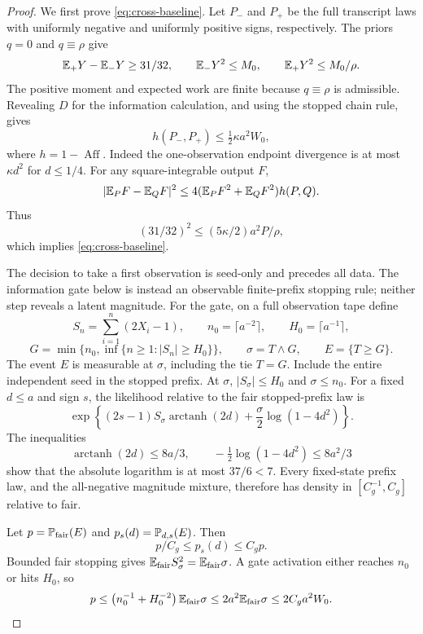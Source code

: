 \begin{proof}
We first prove \eqref{eq:cross-baseline}.  Let \(P_-\) and \(P_+\) be
the full transcript laws with uniformly negative and uniformly positive
signs, respectively.  The priors \(q=0\) and \(q\equiv\rho\) give
\[
 \mathbb E_+Y-\mathbb E_-Y\ge31/32,\qquad
 \mathbb E_-Y^2\le M_0,\qquad \mathbb E_+Y^2\le M_0/\rho.
\]
The positive moment and expected work are finite because \(q\equiv\rho\)
is admissible.  Revealing \(D\) for the information calculation, and
using the stopped chain rule, gives
\[
 h(P_-,P_+)\le\tfrac12\kappa a^2W_0,
\]
where \(h=1-\operatorname{Aff}\).
Indeed the one-observation endpoint divergence is at most
\(\kappa d^2\) for \(d\le1/4\).
For any square-integrable output \(F\),
\begin{equation}
 |\mathbb E_PF-\mathbb E_QF|^2
 \le4(\mathbb E_PF^2+\mathbb E_QF^2)h(P,Q).
 \label{eq:cross-hellinger-moment}
\end{equation}
Thus
\[
 (31/32)^2
 \le(5\kappa/2)a^2P/\rho,
\]
which implies \eqref{eq:cross-baseline}.

The decision to take a first observation is seed-only and precedes
all data. The information gate below is instead an observable
finite-prefix stopping rule; neither step reveals a latent magnitude.
For the gate, on a full observation tape define
\[
 S_n=\sum_{i=1}^n(2X_i-1),\qquad
 n_0=\lceil a^{-2}\rceil,\qquad H_0=\lceil a^{-1}\rceil,
\]
\begin{equation}
 G=\min\{n_0,\inf\{n\ge1:|S_n|\ge H_0\}\},\qquad
 \sigma=T\wedge G,\qquad E=\{T\ge G\}.
 \label{eq:cross-gate}
\end{equation}
The event \(E\) is measurable at \(\sigma\), including the tie \(T=G\).
Include the entire independent seed in the stopped prefix.
At \(\sigma\), \(|S_\sigma|\le H_0\) and \(\sigma\le n_0\).
For a fixed \(d\le a\) and sign \(s\), the likelihood relative to the
fair stopped-prefix law is
\[
 \exp\left\{(2s-1)S_\sigma\operatorname{arctanh}(2d)
       +\frac{\sigma}{2}\log(1-4d^2)\right\}.
\]
The inequalities
\[
 \operatorname{arctanh}(2d)\le8a/3,\qquad
 -\tfrac12\log(1-4d^2)\le8a^2/3
\]
show that the absolute logarithm is at most \(37/6<7\).
Every fixed-state prefix law, and the all-negative magnitude mixture,
therefore has density in \([C_g^{-1},C_g]\) relative to fair.

Let \(p=\mathbb P_{\rm fair}(E)\) and \(p_s(d)=\mathbb P_{d,s}(E)\).  Then
\begin{equation}
 p/C_g\le p_s(d)\le C_gp.
 \label{eq:cross-gate-probabilities}
\end{equation}
Bounded fair stopping gives
\(\mathbb E_{\rm fair}S_\sigma^2=\mathbb E_{\rm fair}\sigma\).
A gate activation either reaches \(n_0\) or hits \(H_0\), so
\begin{equation}
 p\le\left(n_0^{-1}+H_0^{-2}\right)\mathbb E_{\rm fair}\sigma
 \le2a^2\mathbb E_{\rm fair}\sigma
 \le2C_ga^2W_0.
 \label{eq:cross-gate-cost}
\end{equation}


\end{proof}

